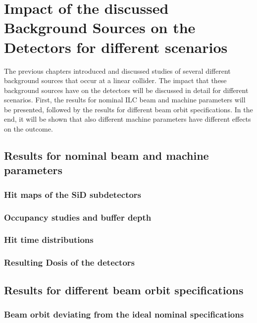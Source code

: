 \chapter{Impact of the discussed Background Sources on the Detectors for different scenarios}
\label{EffectDetectors}
The previous chapters introduced and discussed studies of several different background sources that occur at a linear collider.
The impact that these background sources have on the detectors will be discussed in detail for different scenarios.
First, the results for nominal ILC beam and machine parameters will be presented, followed by the results for different beam orbit specifications.
In the end, it will be shown that also different machine parameters have different effects on the outcome.

\section{Results for nominal beam and machine parameters}
\label{EffectDetectors:Nominal}
\subsection{Hit maps of the SiD subdetectors}
\label{EffectDetectors:hitmaps}
\subsection{Occupancy studies and buffer depth}
\label{EffectDetectors:occupancy}
\subsection{Hit time distributions}
\label{EffectDetectors:hittime}
\subsection{Resulting Dosis of the detectors}
\label{EffectDetectors:dosis}

\section{Results for different beam orbit specifications}
\label{EffectDetectors:BeamOrbit}

\subsection{Beam orbit deviating from the ideal nominal specifications}
\label{EffectDetectors:BeamOrbit:otherspecs}
